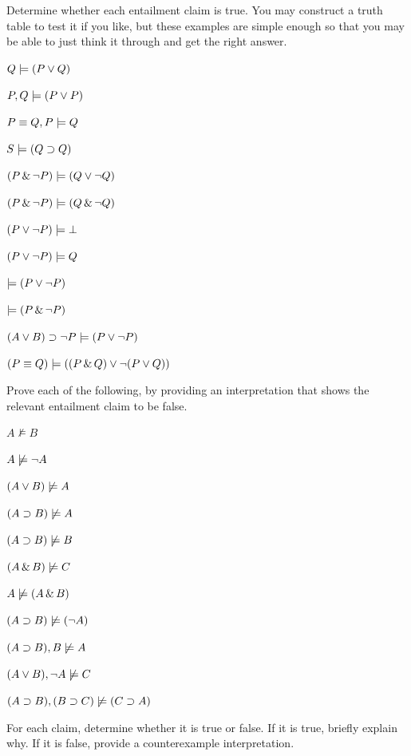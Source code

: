 \solutions
\problempart
\label{pr.entailTF}
Determine whether each entailment claim is true. You may construct a truth table to test it if you like, but these examples are simple enough so that you may be able to just think it through and get the right answer.
\begin{earg}
\item $Q \models (P \vee Q)$
\item $P, Q \models (P \vee P)$
\item $P \equiv Q, P \models Q$
\item $S \models (Q \supset Q)$   
\item $(P \,\&\, \neg P) \models (Q \vee \neg Q)$
\item $(P \,\&\, \neg P) \models (Q \,\&\, \neg Q)$
\item $(P \vee \neg P) \models \bot$
\item $(P \vee \neg P) \models Q$
\item $\models (P \vee \neg P)$
\item $\models (P \,\&\, \neg P)$
\item $(A \vee B) \supset \neg P \models (P \vee \neg P)$
\item $(P \equiv Q) \models ((P \,\&\, Q) \vee \neg (P \vee Q))$
\end{earg}

\problempart
\label{pr.entailmentcounterexamples}
Prove each of the following, by providing an interpretation that shows the relevant entailment claim to be false.
\begin{earg}
\item $A \not\models B$
\item $A \not\models \neg A$
\item $(A \vee B) \not\models A$
\item $(A \supset B) \not\models A$
\item $(A \supset B) \not\models B$
\item $(A \,\&\, B) \not\models C$
\item $A \not\models (A \,\&\, B)$
\item $(A \supset B) \not\models (\neg A)$
\item $(A \supset B), B \not\models A$
\item $(A \vee B), \neg A \not\models C$
\item $(A \supset B), (B \supset C) \not\models (C \supset A)$
\end{earg}

\problempart
For each claim, determine whether it is true or false. If it is true, briefly explain why. If it is false, provide a counterexample interpretation.

